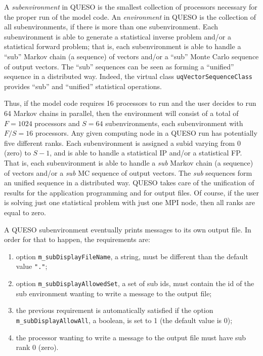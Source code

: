 A {\it subenvironment} in QUESO is the smallest collection of processors necessary for the proper run of the model code.
An {\it environment} in QUESO is the collection of all subenvironments, if there is more than one subenvironment. %
    Each subenvironment is able to generate a statistical inverse problem and/or a statistical forward problem; that is, each subenvironment is able to handle a ``sub'' Markov chain (a sequence) of vectors and/or a ``sub'' Monte Carlo sequence of output vectors.
    The ``sub'' sequences can be seen as forming a ``unified'' sequence in a distributed way.
    Indeed, the virtual class \verb+uqVectorSequenceClass+ provides ``sub'' and ``unified'' statistical operations. 

Thus, if the model code requires 16 processors to run and the user decides to run 64 Markov chains in parallel,
then the environment will consist of a total of $F=1024$ processors and $S=64$ subenvironments, each subenvironment with $F/S=16$ processors.
Any given computing node in a QUESO run has potentially five different ranks.
Each subenvironment is assigned a subid varying from $0$ (zero) to $S-1$, and is able to handle a statistical IP and/or a statistical FP.
That is, each subenvironment is able to handle a {\it sub} Markov chain (a sequence) of vectors and/or a {\it sub} MC sequence of output vectors.
The {\it sub} sequences form an unified sequence in a distributed way.
QUESO takes care of the unification of results for the application programming and for output files.  Of course, if the user is solving just one statistical problem with just one MPI node, then all ranks are equal to zero.

A QUESO subenvironment eventually prints messages to its own output file. In order for that to happen, the requirements are:
\begin{enumerate}
 \item option \verb+m_subDisplayFileName+, a string, must be different than the default value \verb+"."+;
\item  option \verb+m_subDisplayAllowedSet+, a set of sub ids, must contain the id of the sub environment wanting to write a message to the output file;
\item  the previous requirement is automatically satisfied if the option \verb+m_subDisplayAllowAll+, a boolean, is set to 1 (the default value is 0);
\item  the processor wanting to write a message to the output file must have sub rank 0 (zero).
\end{enumerate}

